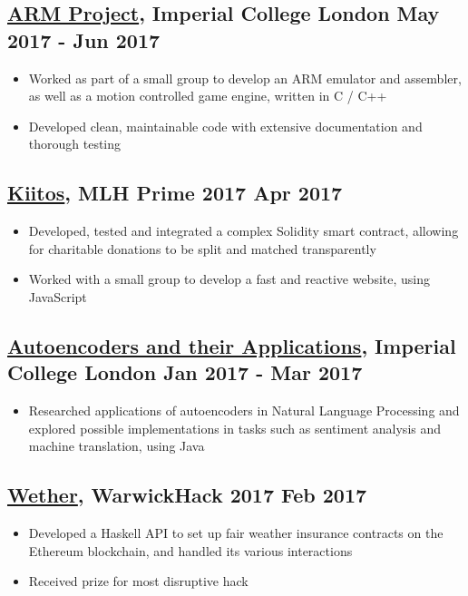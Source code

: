 \documentclass[a4paper, 8pt]{extarticle}
\begin{document}
\begin{minipage}[t]{.66\textwidth}
\subsection*{\href{https://github.com/ic-projects/arm11}{ARM Project}, Imperial College London \hfill May 2017 - Jun 2017}
\begin{itemize}
	\item Worked as part of a small group to develop an ARM emulator and assembler, as well as a motion controlled game engine, written in C / C++
	\item Developed clean, maintainable code with extensive documentation and thorough testing
\end{itemize}

\subsection*{\href{https://devpost.com/software/kiitos}{Kiitos}, MLH Prime 2017 \hfill Apr 2017}
\begin{itemize}
	\item Developed, tested and integrated a complex Solidity smart contract, allowing for charitable donations to be split and matched transparently
	\item Worked with a small group to develop a fast and reactive website, using JavaScript
\end{itemize}

\subsection*{\href{https://www.doc.ic.ac.uk/~js4416/163/website/}{Autoencoders and their Applications}, Imperial College London \hfill Jan 2017 - Mar 2017}
\begin{itemize}
	\item Researched applications of autoencoders in Natural Language Processing and explored possible implementations in tasks such as sentiment analysis and machine translation, using Java
\end{itemize}

\subsection*{\href{https://devpost.com/software/weather-g8lp3r}{Wether}, WarwickHack 2017 \hfill Feb 2017}
\begin{itemize}
	\item Developed a Haskell API to set up fair weather insurance contracts on the Ethereum blockchain, and handled its various interactions
	\item Received prize for most disruptive hack
\end{itemize}


\end{minipage}
\end{document}
